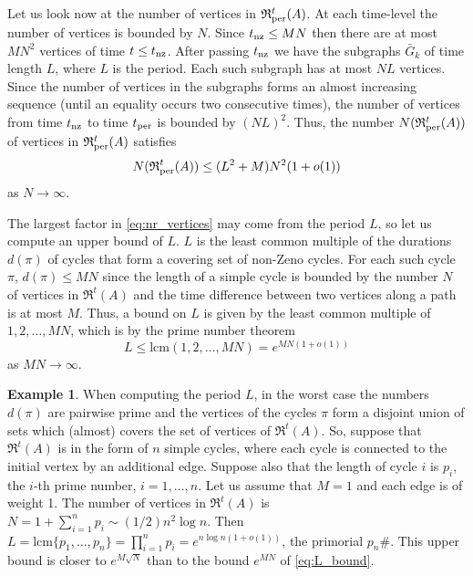 \documentclass[11pt]{amsart}
\theoremstyle{definition}
\newtheorem{example}[theorem]{Example}
\newcommand{\ARRR}{\mathfrak{R}^t}
\newcommand{\PARRR}{\mathfrak{R}_\textnormal{per}^{t}}
\newcommand{\lcm}{\mathrm{lcm}}
\begin{document}
Let us look now at the number of vertices in $\PARRR(A)$.
At each time-level the number of vertices is bounded by $N$.
Since $t_{\textnormal{nz}} \leq MN$ then there are at most $MN^2$ vertices of time $t \leq t_{\textnormal{nz}}$.
After passing $t_{\textnormal{nz}}$ we have the subgraphs $\bar{G}_k$ of time length $L$, where $L$ is the period.
Each such subgraph has at most $N L$ vertices.
Since the number of vertices in the subgraphs forms an almost increasing sequence (until an equality occurs two consecutive times), the number of vertices from time $t_{\textnormal{nz}}$ to time $t_\textnormal{per}$ is bounded by $(N L)^2$. 
Thus, the number $N(\PARRR(A))$ of vertices in $\PARRR(A)$ satisfies
\begin{equation}
N(\PARRR(A)) \leq (L^2 + M)N^2 (1+o(1))
\label{eq:nr_vertices}
\end{equation}
as $N \to \infty$.

The largest factor in \eqref{eq:nr_vertices} may come from the period $L$, so let us compute an upper bound of $L$.
$L$ is the least common multiple of the durations $d(\pi)$ of cycles that form a covering set of non-Zeno cycles.
For each such cycle $\pi$, $d(\pi) \leq MN$ since  the length of a simple cycle is bounded by the number $N$ of vertices in $\ARRR(A)$ and the time difference between two vertices along a path is at most $M$.
Thus, a bound on $L$ is given by the least common multiple of $1,2, \ldots, MN$, which is by the prime number theorem
\begin{equation}
L \leq \lcm(1,2, \ldots, MN) = e^{MN(1+o(1))}
\label{eq:L_bound}
\end{equation}
as $MN \to \infty$.

\begin{example}
	When computing the period $L$, in the worst case the numbers $d(\pi)$ are pairwise prime and the vertices of the cycles $\pi$ form a disjoint union of sets which (almost) covers the set of vertices of $\ARRR(A)$.
	So, suppose that $\ARRR(A)$ is in the form of $n$ simple cycles, where each cycle is connected to the initial vertex by an additional edge.
	Suppose also that the length of cycle $i$ is $p_i$, the $i$-th prime number, $i = 1, \ldots, n$.
	Let us assume that $M=1$ and each edge is of weight 1.
	The number of vertices in $\ARRR(A)$ is $N = 1 + \sum_{i = 1}^{n} p_i \sim (1/2) n^2 \log n$.
Then $L= \lcm \{ p_1, \ldots, p_n \} = \prod_{i = 1}^{n} p_i = e^{n \log n (1+o(1))}$, the primorial $p_n\#$.
	This upper bound is closer to $e^{M\sqrt{N}}$ than to the bound $e^{MN}$ of \eqref{eq:L_bound}. 
\end{example}
\end{document}
